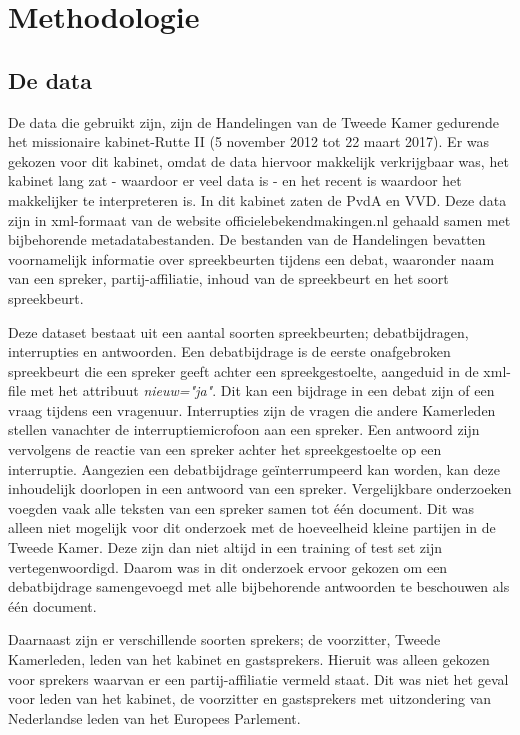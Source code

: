 \section{Methodologie}
\label{sec:meth}


\subsection{De data}
\label{data}
De data die gebruikt zijn, zijn de Handelingen van de Tweede Kamer gedurende het missionaire kabinet-Rutte II (5 november 2012 tot 22 maart 2017). Er was gekozen voor dit kabinet, omdat de data hiervoor makkelijk verkrijgbaar was, het kabinet lang zat - waardoor er veel data is - en het recent is waardoor het makkelijker te interpreteren is. In dit kabinet zaten de PvdA en VVD. Deze data zijn in xml-formaat van de website officielebekendmakingen.nl gehaald samen met bijbehorende metadatabestanden. De bestanden van de Handelingen bevatten voornamelijk informatie over spreekbeurten tijdens een debat, waaronder naam van een spreker, partij-affiliatie, inhoud van de spreekbeurt en het soort spreekbeurt.\par
Deze dataset bestaat uit een aantal soorten spreekbeurten; debatbijdragen, interrupties en antwoorden. Een debatbijdrage is de eerste onafgebroken spreekbeurt die een spreker geeft achter een spreekgestoelte, aangeduid in de xml-file met het attribuut \textit{nieuw="ja"}. Dit kan een bijdrage in een debat zijn of een vraag tijdens een vragenuur. Interrupties zijn de vragen die andere Kamerleden stellen vanachter de interruptiemicrofoon aan een spreker. Een antwoord zijn vervolgens de reactie van een spreker achter het spreekgestoelte op een interruptie. Aangezien een debatbijdrage geïnterrumpeerd kan worden, kan deze inhoudelijk doorlopen in een antwoord van een spreker. Vergelijkbare onderzoeken voegden vaak alle teksten van een spreker samen tot één document. Dit was alleen niet mogelijk voor dit onderzoek met de hoeveelheid kleine partijen in de Tweede Kamer. Deze zijn dan niet altijd in een training of test set zijn vertegenwoordigd. Daarom was in dit onderzoek ervoor gekozen om een debatbijdrage samengevoegd met alle bijbehorende antwoorden te beschouwen als één document.\par
Daarnaast zijn er verschillende soorten sprekers; de voorzitter, Tweede Kamerleden, leden van het kabinet en gastsprekers. Hieruit was alleen gekozen voor sprekers waarvan er een partij-affiliatie vermeld staat. Dit was niet het geval voor leden van het kabinet, de voorzitter en gastsprekers met uitzondering van Nederlandse leden van het Europees Parlement.\par

